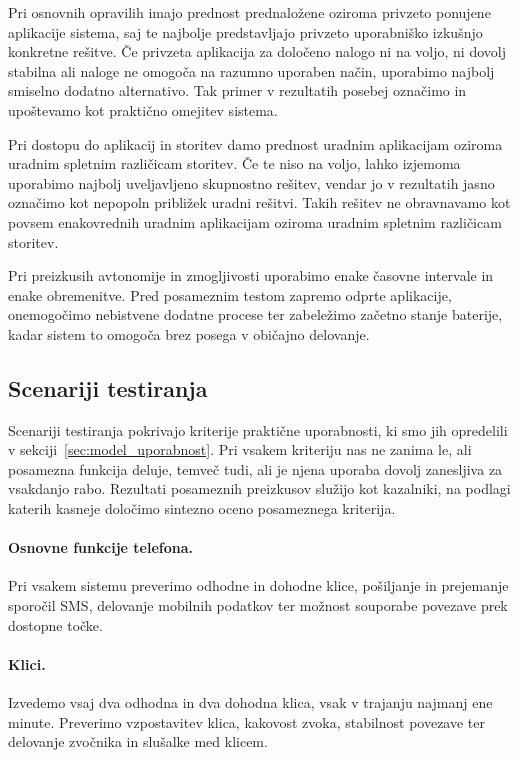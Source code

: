 \documentclass[a4paper,12pt,openright]{book}
\begin{document}
Pri osnovnih opravilih imajo prednost prednaložene oziroma privzeto ponujene aplikacije sistema, saj te najbolje predstavljajo privzeto uporabniško izkušnjo konkretne rešitve.
Če privzeta aplikacija za določeno nalogo ni na voljo, ni dovolj stabilna ali naloge ne omogoča na razumno uporaben način, uporabimo najbolj smiselno dodatno alternativo.
Tak primer v rezultatih posebej označimo in upoštevamo kot praktično omejitev sistema.

Pri dostopu do aplikacij in storitev damo prednost uradnim aplikacijam oziroma uradnim spletnim različicam storitev.
Če te niso na voljo, lahko izjemoma uporabimo najbolj uveljavljeno skupnostno rešitev, vendar jo v rezultatih jasno označimo kot nepopoln približek uradni rešitvi.
Takih rešitev ne obravnavamo kot povsem enakovrednih uradnim aplikacijam oziroma uradnim spletnim različicam storitev.

Pri preizkusih avtonomije in zmogljivosti uporabimo enake časovne intervale in enake obremenitve.
Pred posameznim testom zapremo odprte aplikacije, onemogočimo nebistvene dodatne procese ter zabeležimo začetno stanje baterije, kadar sistem to omogoča brez posega v običajno delovanje.

\subsection{Scenariji testiranja}
\label{subsec:scenariji_testiranja}

Scenariji testiranja pokrivajo kriterije praktične uporabnosti, ki smo jih opredelili v sekciji~\ref{sec:model_uporabnost}.
Pri vsakem kriteriju nas ne zanima le, ali posamezna funkcija deluje, temveč tudi, ali je njena uporaba dovolj zanesljiva za vsakdanjo rabo.
Rezultati posameznih preizkusov služijo kot kazalniki, na podlagi katerih kasneje določimo sintezno oceno posameznega kriterija.

\paragraph{Osnovne funkcije telefona.}
Pri vsakem sistemu preverimo odhodne in dohodne klice, pošiljanje in prejemanje sporočil SMS, delovanje mobilnih podatkov ter možnost souporabe povezave prek dostopne točke.

\paragraph{Klici.}
Izvedemo vsaj dva odhodna in dva dohodna klica, vsak v trajanju najmanj ene minute.
Preverimo vzpostavitev klica, kakovost zvoka, stabilnost povezave ter delovanje zvočnika in slušalke med klicem.
\end{document}

